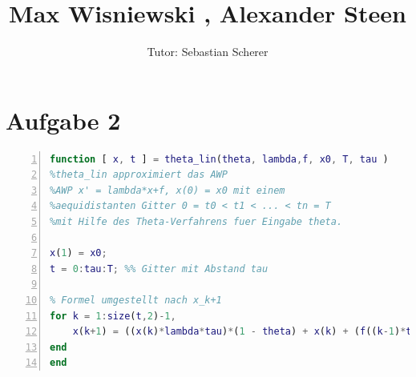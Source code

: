 \documentclass[11pt,a4paper,ngerman]{article}
\author{Tutor: Sebastian Scherer}
\date{}
\title{Max Wisniewski , Alexander Steen}
\begin{document}

\maketitle
\thispagestyle{fancy}




\section*{Aufgabe 2}

\begin{lstlisting}[language=matlab, numbers=left]
function [ x, t ] = theta_lin(theta, lambda,f, x0, T, tau )
%theta_lin approximiert das AWP
%AWP x' = lambda*x+f, x(0) = x0 mit einem
%aequidistanten Gitter 0 = t0 < t1 < ... < tn = T
%mit Hilfe des Theta-Verfahrens fuer Eingabe theta.

x(1) = x0;
t = 0:tau:T; %% Gitter mit Abstand tau

% Formel umgestellt nach x_k+1
for k = 1:size(t,2)-1,
    x(k+1) = ((x(k)*lambda*tau)*(1 - theta) + x(k) + (f((k-1)*tau)*tau)*(1-theta)+ theta*tau*f(k*tau))/(1-tau*lambda*theta)
end
end
\end{lstlisting}
\end{document}
